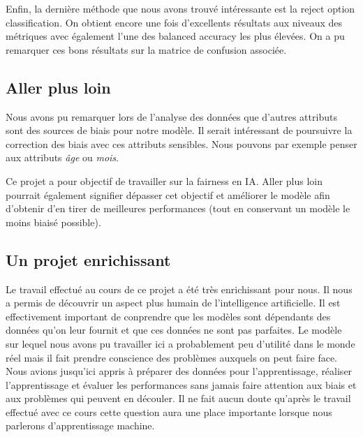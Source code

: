 \documentclass{article}
\begin{document}
    Enfin, la dernière méthode que nous avons trouvé intéressante est la reject option classification. On 
    obtient encore une fois d'excellents résultats aux niveaux des métriques avec également l'une des balanced 
    accuracy les plus élevées. On a pu remarquer ces bons résultats sur la matrice de confusion associée.

    \subsection{Aller plus loin}
    Nous avons pu remarquer lors de l'analyse des données que d'autres attributs sont des sources de biais pour 
    notre modèle. Il serait intéressant de poursuivre la correction des biais avec ces attributs 
    sensibles. Nous pouvons par exemple penser aux attributs \textit{âge} ou \textit{mois}. 
    
    Ce projet a pour objectif de travailler sur la fairness en IA. Aller plus loin pourrait également 
    signifier dépasser cet objectif et améliorer le modèle afin d'obtenir d'en tirer de meilleures 
    performances (tout en conservant un modèle le moins biaisé possible).

    \subsection{Un projet enrichissant}
    Le travail effectué au cours de ce projet a été très enrichissant pour nous. Il nous a permis de 
    découvrir un aspect plus humain de l'intelligence artificielle. Il est effectivement important de 
    conprendre que les modèles sont dépendants des données qu'on leur fournit et que ces données ne 
    sont pas parfaites. Le modèle sur lequel nous avons pu travailler ici a probablement peu d'utilité 
    dans le monde réel mais il fait prendre conscience des problèmes auxquels on peut faire face.
    Nous avions jusqu'ici appris à préparer des données pour l'apprentissage, réaliser l'apprentissage et
    évaluer les performances sans jamais faire attention aux biais et aux problèmes qui peuvent en découler.
    Il ne fait aucun doute qu'après le travail effectué avec ce cours cette question aura une place 
    importante lorsque nous parlerons d'apprentissage machine.


    \newpage
    \appendix
\end{document}
